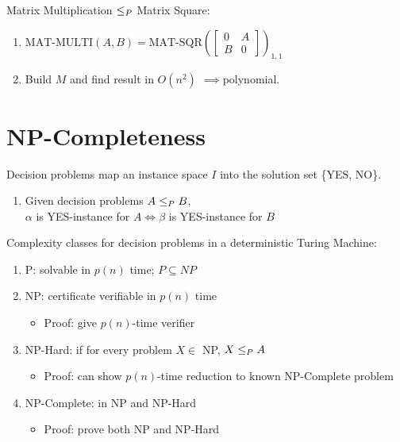 \documentclass[12pt, a4paper]{article}
\begin{document}
\begin{multicols*}{3}
Matrix Multiplication $\leq_{P}$ Matrix Square:
\begin{enumerate}[\roman*.]
  \item $\text{MAT-MULTI}(A, B) = \text{MAT-SQR}(\begin{bmatrix}
      0 & A\\
      B & 0
      \end{bmatrix})_{1, 1}$
  \item Build $M$ and find result in $O(n^{2})$ $\implies $polynomial.
\end{enumerate}


\colbreak

\section{NP-Completeness}

Decision problems map an instance space $I$ into the solution set \{YES, NO\}.
\begin{enumerate}[\roman*.]
  \item Given decision problems $A \leq_{P} B$,\\ $\alpha$ is YES-instance for $A \Leftrightarrow \beta$ is YES-instance for $B$
\end{enumerate}


Complexity classes for decision problems in a deterministic Turing Machine:
\begin{enumerate}[\roman*.]
  \item P: solvable in $p(n)$ time; $P \subseteq NP$
  \item NP: certificate verifiable in $p(n)$ time
    \begin{itemize}[leftmargin=*]\vspace{2pt}
      \item Proof: give $p(n)$-time verifier
    \end{itemize}
  \item NP-Hard: if for every problem $ X \in$ NP, $X \leq_{P} A$
    \begin{itemize}[leftmargin=*]\vspace{2pt}
      \item Proof: can show $p(n)$-time reduction to known NP-Complete problem
    \end{itemize}
  \item NP-Complete: in NP and NP-Hard
    \begin{itemize}[leftmargin=*]\vspace{2pt}
      \item Proof: prove both NP and NP-Hard 
    \end{itemize}
\end{enumerate}


\end{multicols*}
\end{document}
